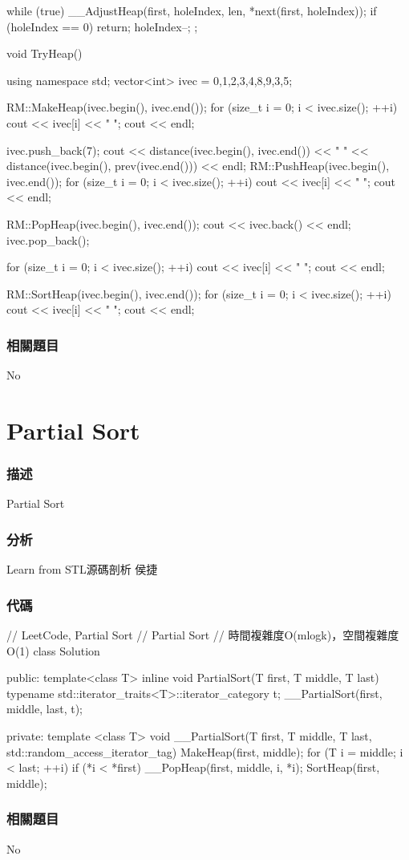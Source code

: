 \begin{Code}
{{        while (true)
        {
            __AdjustHeap(first, holeIndex, len, *next(first, holeIndex));
            if (holeIndex == 0) return;
            holeIndex--;
        }
    }
};

void TryHeap()
{
    using namespace std;
    vector<int> ivec = {0,1,2,3,4,8,9,3,5};

    RM::MakeHeap(ivec.begin(), ivec.end());
    for (size_t i = 0; i < ivec.size(); ++i)
        cout << ivec[i] << " ";
    cout << endl;

    ivec.push_back(7);
    cout << distance(ivec.begin(), ivec.end())
         << " " << distance(ivec.begin(), prev(ivec.end())) << endl;
    RM::PushHeap(ivec.begin(), ivec.end());
    for (size_t i = 0; i < ivec.size(); ++i)
        cout << ivec[i] << " ";
    cout << endl;

    RM::PopHeap(ivec.begin(), ivec.end());
    cout << ivec.back() << endl;
    ivec.pop_back();

    for (size_t i = 0; i < ivec.size(); ++i)
        cout << ivec[i] << " ";
    cout << endl;

    RM::SortHeap(ivec.begin(), ivec.end());
    for (size_t i = 0; i < ivec.size(); ++i)
        cout << ivec[i] << " ";
    cout << endl;
}
\end{Code}

\subsubsection{相關題目}
No

\section{Partial Sort} %
\label{sec:partial-sort}


\subsubsection{描述}
Partial Sort


\subsubsection{分析}
Learn from STL源碼剖析 侯捷


\subsubsection{代碼}
\begin{Code}
// LeetCode, Partial Sort
// Partial Sort
// 時間複雜度O(mlogk)，空間複雜度O(1)
class Solution {
public:
    template<class T>
    inline void PartialSort(T first, T middle, T last)
    {
        typename std::iterator_traits<T>::iterator_category t;
        __PartialSort(first, middle, last, t);
    }

private:
    template <class T>
        void __PartialSort(T first, T middle, T last, std::random_access_iterator_tag)
    {
        MakeHeap(first, middle);
        for (T i = middle; i < last; ++i)
        {
            if (*i < *first)
                __PopHeap(first, middle, i, *i);
        }
        SortHeap(first, middle);
    }
}
\end{Code}

\subsubsection{相關題目}
No
